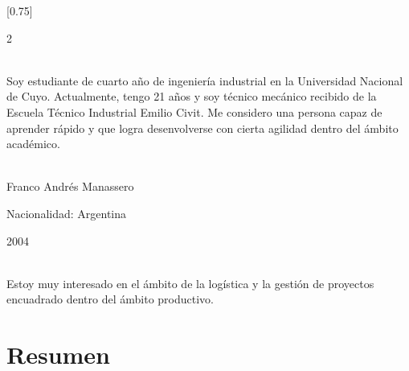 \documentclass[lighthipster]{simplehipstercv}
\begin{document}
\setlength{\columnsep}{2cm}
[0.75]
\begin{paracol}{2}

\paracolbackgroundoptions



\footnotesize
{\setasidefontcolour
\flushright
\begin{center}
\end{center}

\\[0.5em]

{Soy estudiante de cuarto año de ingeniería industrial en la Universidad Nacional de Cuyo. Actualmente, tengo 21 años y soy técnico mecánico recibido de la Escuela Técnico Industrial Emilio Civit. Me considero una persona capaz de aprender rápido y que logra desenvolverse con cierta agilidad dentro del ámbito académico. }
\bigskip

 \\[0.5em]
Franco Andrés Manassero

Nacionalidad: Argentina

2004

\bigskip

\\[0.5em]
{Estoy muy interesado en el ámbito de la logística y la gestión de proyectos encuadrado dentro del ámbito productivo.}
\bigskip


\vspace{4em}


\phantom{turn the page}

\phantom{turn the page}
}
\switchcolumn

\small
\section*{Resumen}


\end{paracol}
\end{document}
